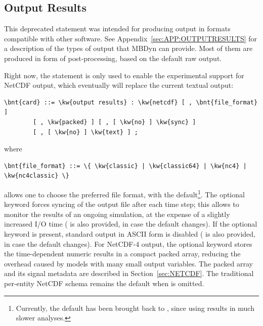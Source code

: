 \subsection{Output Results}\label{sec:CONTROLDATA:NETCDF}
This deprecated statement was intended for producing output in formats
compatible with other software.
See Appendix~\ref{sec:APP:OUTPUTRESULTS} for a description of the types
of output that MBDyn can provide.
Most of them are produced in form of post-processing, based on the default
raw output.

Right now, the  statement is only used to enable
the experimental support for NetCDF output, which eventually
will replace the current textual output:
\begin{Verbatim}[commandchars=\\\{\}]
    \bnt{card} ::= \kw{output results} : \kw{netcdf} [ , \bnt{file_format} ]
        [ , \kw{packed} ] [ , [ \kw{no} ] \kw{sync} ]
        [ , [ \kw{no} ] \kw{text} ] ;
\end{Verbatim}
where
\begin{Verbatim}[commandchars=\\\{\}]
    \bnt{file_format} ::= \{ \kw{classic} | \kw{classic64} | \kw{nc4} | \kw{nc4classic} \}
\end{Verbatim}
allows one to choose the preferred file format, with  the default\footnote{%
Currently, the default has been brought back to , since using  results in much slower analyses.
}.
The optional  keyword forces syncing of the
output file after each time step; this allows to monitor the results of an ongoing simulation, 
at the expense of a slightly increased I/O time ( is also provided, in case the default changes).
If the optional keyword  is present,
standard output in ASCII form is disabled ( is also provided, in case the default changes).
For NetCDF-4 output, the optional  keyword stores the
time-dependent numeric results in a compact packed array, reducing the
overhead caused by models with many small output variables.  The packed
array and its signal metadata are described in Section~\ref{sec:NETCDF}.
The traditional per-entity NetCDF schema remains the default when
 is omitted.

